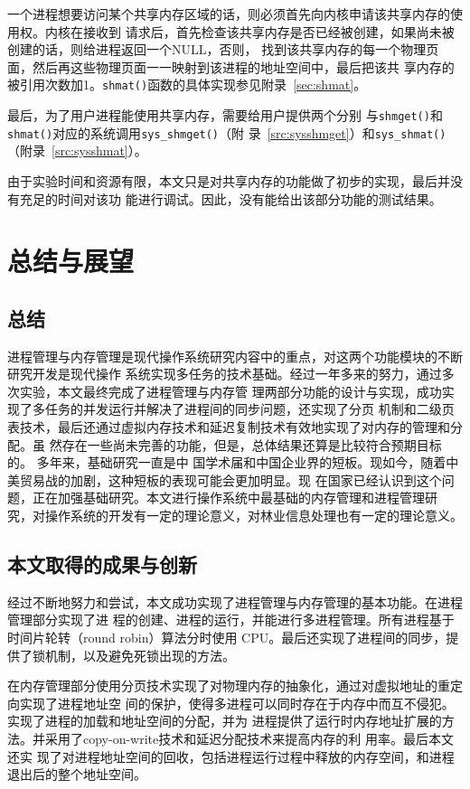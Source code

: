 \documentclass{swfcthesismscctex}
\begin{document}
一个进程想要访问某个共享内存区域的话，则必须首先向内核申请该共享内存的使用权。内核在接收到
请求后，首先检查该共享内存是否已经被创建，如果尚未被创建的话，则给进程返回一个NULL，否则，
找到该共享内存的每一个物理页面，然后再这些物理页面一一映射到该进程的地址空间中，最后把该共
享内存的被引用次数加1。\texttt{shmat()}函数的具体实现参见附录~\ref{sec:shmat}。

最后，为了用户进程能使用共享内存，需要给用户提供两个分别
与\texttt{shmget()}和\texttt{shmat()}对应的系统调用\texttt{sys\_shmget()}（附
录~\ref{src:sysshmget}）和\texttt{sys\_shmat()}（附录~\ref{src:sysshmat}）。

由于实验时间和资源有限，本文只是对共享内存的功能做了初步的实现，最后并没有充足的时间对该功
能进行调试。因此，没有能给出该部分功能的测试结果。
\chapter{总结与展望}

\section{总结}

进程管理与内存管理是现代操作系统研究内容中的重点，对这两个功能模块的不断研究开发是现代操作
系统实现多任务的技术基础。经过一年多来的努力，通过多次实验，本文最终完成了进程管理与内存管
理两部分功能的设计与实现，成功实现了多任务的并发运行并解决了进程间的同步问题，还实现了分页
机制和二级页表技术，最后还通过虚拟内存技术和延迟复制技术有效地实现了对内存的管理和分配。虽
然存在一些尚未完善的功能，但是，总体结果还算是比较符合预期目标的。 多年来，基础研究一直是中
国学术届和中国企业界的短板。现如今，随着中美贸易战的加剧，这种短板的表现可能会更加明显。现
在国家已经认识到这个问题，正在加强基础研究。本文进行操作系统中最基础的内存管理和进程管理研
究，对操作系统的开发有一定的理论意义，对林业信息处理也有一定的理论意义。

\section{本文取得的成果与创新}

经过不断地努力和尝试，本文成功实现了进程管理与内存管理的基本功能。在进程管理部分实现了进
程的创建、进程的运行，并能进行多进程管理。所有进程基于时间片轮转（round robin）算法分时使用
CPU。最后还实现了进程间的同步，提供了锁机制，以及避免死锁出现的方法。

在内存管理部分使用分页技术实现了对物理内存的抽象化，通过对虚拟地址的重定向实现了进程地址空
间的保护，使得多进程可以同时存在于内存中而互不侵犯。实现了进程的加载和地址空间的分配，并为
进程提供了运行时内存地址扩展的方法。并采用了copy-on-write技术和延迟分配技术来提高内存的利
用率。最后本文还实
现了对进程地址空间的回收，包括进程运行过程中释放的内存空间，和进程退出后的整个地址空间。  
\end{document}
